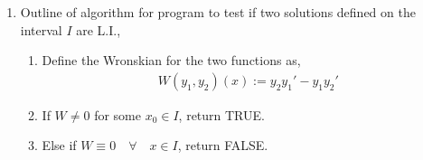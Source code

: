 \begin{enumerate}
    \item Outline of algorithm for program to test if two solutions defined on the
          interval $ I $ are L.I.,
          \begin{enumerate}
              \item Define the Wronskian for the two functions as,
                    \begin{align}
                        W(y_{1}, y_{2})(x) := y_{2}y_{1}' - y_{1}y_{2}'
                    \end{align}
              \item If $ W \neq 0 $ for some $ x_{0} \in I $, return TRUE.
              \item Else if $ W \equiv 0 \quad \forall \quad x \in I$, return FALSE.
          \end{enumerate}
\end{enumerate}